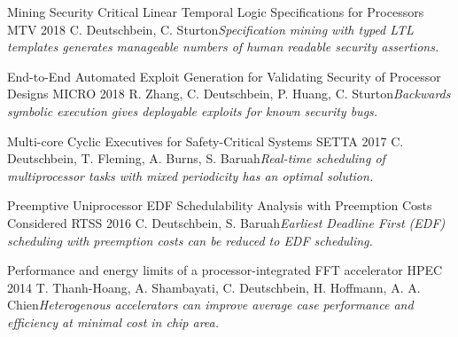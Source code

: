 
\begin{cventries}
  \cventry
    {}%
    {Mining Security Critical Linear Temporal Logic Specifications for Processors} %
    {MTV 2018} %
    {}
    {C. Deutschbein, C. Sturton\newline\textit{Specification mining with typed LTL templates generates manageable numbers of human readable security assertions.}}

  \cventry
    {}
    {End-to-End Automated Exploit Generation for Validating Security of Processor Designs} %
    {MICRO 2018} %
    {}
    {R. Zhang, C. Deutschbein, P. Huang, C. Sturton\newline\textit{Backwards symbolic execution gives deployable exploits for known security bugs.}\newline\color{red}{Nominated for Best Paper.}}

  \cventry
    {}
    {Multi-core Cyclic Executives for Safety-Critical Systems} %
    {SETTA 2017} %
    {}
    {C. Deutschbein, T. Fleming, A. Burns, S. Baruah\newline\textit{Real-time scheduling of multiprocessor tasks with mixed periodicity has an optimal solution.}}

  \cventry
    {}
    {Preemptive Uniprocessor EDF Schedulability Analysis with Preemption Costs Considered} %
    {RTSS 2016} %
    {}
    {C. Deutschbein, S. Baruah\newline\textit{Earliest Deadline First (EDF) scheduling with preemption costs can be reduced to EDF scheduling.}}

  \cventry
    {}
    {Performance and energy limits of a processor-integrated FFT accelerator} %
    {HPEC 2014} %
    {}
    {T. Thanh-Hoang, A. Shambayati, C. Deutschbein, H. Hoffmann, A. A. Chien\newline\textit{Heterogenous accelerators can improve average case performance and efficiency at minimal cost in chip area.}}

\end{cventries}
